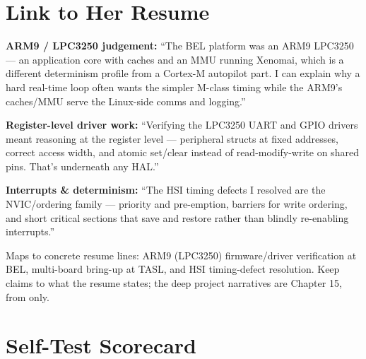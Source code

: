 \section{Link to Her Resume}

\begin{resumelink}
\textbf{ARM9 / LPC3250 judgement:} ``The BEL platform was an ARM9 LPC3250 ---
an application core with caches and an MMU running Xenomai, which is a different
determinism profile from a Cortex-M autopilot part. I can explain why a hard
real-time loop often wants the simpler M-class timing while the ARM9's
caches/MMU serve the Linux-side comms and logging.''

\medskip
\textbf{Register-level driver work:} ``Verifying the LPC3250 UART and GPIO
drivers meant reasoning at the register level ---  peripheral
structs at fixed addresses, correct access width, and atomic set/clear instead
of read-modify-write on shared pins. That's underneath any HAL.''

\medskip
\textbf{Interrupts \& determinism:} ``The HSI timing defects I resolved are the
NVIC/ordering family --- priority and pre-emption, barriers for write ordering,
and short critical sections that save and restore  rather than
blindly re-enabling interrupts.''

\medskip
\small Maps to concrete resume lines: ARM9 (LPC3250) firmware/driver
verification at BEL, multi-board bring-up at TASL, and HSI timing-defect
resolution. Keep claims to what the resume states; the deep project narratives
are Chapter 15, from  only.
\end{resumelink}

\section{Self-Test Scorecard}

